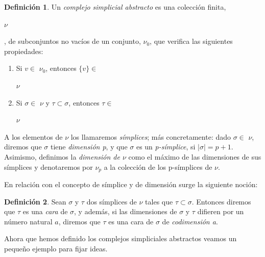 \documentclass[12pt, a4paper, twoside]{book}
\numberwithin{equation}{section}
\theoremstyle{definition}
\newtheorem{defi}{Definición}
\theoremstyle{remark}
\theoremstyle{plain}
\begin{document}
	\begin{defi}
	
	Un \textit{complejo simplicial abstracto} es una colección finita, 
	\begin{Large}$\nu$\end{Large}, de subconjuntos no vacíos de un 
	conjunto, {\Large $\nu$}$_{0}$, que verifica las siguientes 
	propiedades:
	
	\begin{enumerate}
		\item Si $v \in $ {\Large $ \nu$}$_{0}$, entonces $\{v\} \in$
			\begin{Large}$ \nu$\end{Large}
		\item Si $\sigma \in $ {\Large $ \nu$}$ \text{ y } \tau 
			\subset \sigma$, entonces $ \tau \in $
			\begin{Large}$ \nu$\end{Large}
	\end{enumerate}
	
	A los elementos de {\Large $\nu$} los llamaremos \textit{símplices};
	más concretamente: dado $\sigma \in $ {\Large $\nu$}, diremos que 
	$\sigma$ tiene \textit{dimensión p}, y que $\sigma$ es un 
	\textit{p-símplice}, si $|\sigma|=p+1$. Asimismo, definimos la 
	\textit{dimensión de {\Large $\nu$}} como el máximo de las dimensiones 
	de sus símplices y denotaremos por {\Large $\nu$}$_{p}$ a la colección 
	de los p-símplices de {\Large $\nu$}.	
	
	\end{defi}
	
	En relación con el concepto de símplice y de dimensión surge la 
	siguiente noción: 

	\begin{defi}
		Sean $\sigma$ y $\tau$ dos símplices de {\Large $\nu$} tales 
		que $\tau \subset \sigma$. Entonces diremos que $\tau$ es una 
		\textit{cara} de $\sigma$, y además, si las dimensiones de 
		$\sigma$ y $\tau$ difieren por un número natural $a$, 
		diremos que $\tau$ es una cara de $\sigma$ de 
		\textit{codimensión a}.
	\end{defi}

	Ahora que hemos definido los complejos simpliciales abstractos veamos 
	un pequeño ejemplo para fijar ideas.
\end{document}
